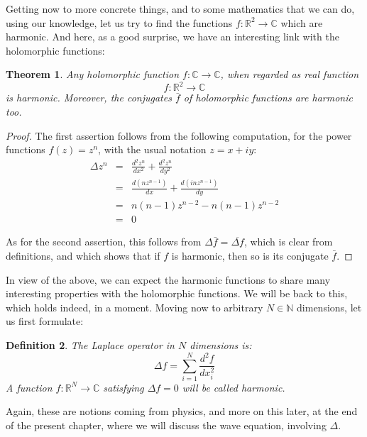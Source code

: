 \documentclass[12pt]{amsbook}
\newtheorem{theorem}{Theorem}[chapter]
\newtheorem{definition}[theorem]{Definition}
\begin{document}
Getting now to more concrete things, and to some mathematics that we can do, using our knowledge, let us try to find the functions $f:\mathbb R^2\to\mathbb C$ which are harmonic. And here, as a good surprise, we have an interesting link with the holomorphic functions:


\begin{theorem}
Any holomorphic function $f:\mathbb C\to\mathbb C$, when regarded as real function
$$f:\mathbb R^2\to\mathbb C$$
is harmonic. Moreover, the conjugates $\bar{f}$ of holomorphic functions are harmonic too.
\end{theorem}

\begin{proof}
The first assertion follows from the following computation, for the power functions $f(z)=z^n$, with the usual notation $z=x+iy$:
\begin{eqnarray*}
\Delta z^n
&=&\frac{d^2z^n}{dx^2}+\frac{d^2z^n}{dy^2}\\
&=&\frac{d(nz^{n-1})}{dx}+\frac{d(inz^{n-1})}{dy}\\
&=&n(n-1)z^{n-2}-n(n-1)z^{n-2}\\
&=&0
\end{eqnarray*}

As for the second assertion, this follows from $\Delta\bar{f}=\overline{\Delta f}$, which is clear from definitions, and which shows that if $f$ is harmonic, then so is its conjugate $\bar{f}$.
\end{proof}

In view of the above, we can expect the harmonic functions to share many interesting properties with the holomorphic functions. We will be back to this, which holds indeed, in a moment. Moving now to arbitrary $N\in\mathbb N$ dimensions, let us first formulate:


\begin{definition}
The Laplace operator in $N$ dimensions is:
$$\Delta f=\sum_{i=1}^N\frac{d^2f}{dx_i^2}$$
A function $f:\mathbb R^N\to\mathbb C$ satisfying $\Delta f=0$ will be called harmonic.
\end{definition}

Again, these are notions coming from physics, and more on this later, at the end of the present chapter, where we will discuss the wave equation, involving $\Delta$. 

\bigskip
\end{document}
